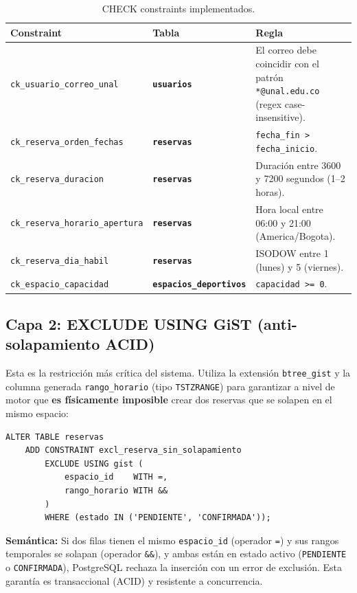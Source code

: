 \documentclass[12pt, a4paper]{article}
\newcommand{\tname}[1]{\texttt{\textbf{#1}}}
\begin{document}
\begin{table}[H]
\centering
\renewcommand{\arraystretch}{1.3}
\begin{tabularx}{\textwidth}{l l X}
    \toprule
    \textbf{Constraint} & \textbf{Tabla} & \textbf{Regla} \\
    \midrule
    \texttt{ck\_usuario\_correo\_unal} & \tname{usuarios} &
        El correo debe coincidir con el patrón \texttt{*@unal.edu.co} (regex case-insensitive). \\
    \texttt{ck\_reserva\_orden\_fechas} & \tname{reservas} &
        \texttt{fecha\_fin > fecha\_inicio}. \\
    \texttt{ck\_reserva\_duracion} & \tname{reservas} &
        Duración entre 3600 y 7200 segundos (1--2 horas). \\
    \texttt{ck\_reserva\_horario\_apertura} & \tname{reservas} &
        Hora local entre 06:00 y 21:00 (America/Bogota). \\
    \texttt{ck\_reserva\_dia\_habil} & \tname{reservas} &
        ISODOW entre 1 (lunes) y 5 (viernes). \\
    \texttt{ck\_espacio\_capacidad} & \tname{espacios\_deportivos} &
        \texttt{capacidad >= 0}. \\
    \bottomrule
\end{tabularx}
\caption{CHECK constraints implementados.}
\end{table}

\subsection{Capa 2: EXCLUDE USING GiST (anti-solapamiento ACID)}

Esta es la restricción más crítica del sistema. Utiliza la extensión \texttt{btree\_gist} y la columna generada \texttt{rango\_horario} (tipo \texttt{TSTZRANGE}) para garantizar a nivel de motor que \textbf{es físicamente imposible} crear dos reservas que se solapen en el mismo espacio:

\begin{lstlisting}[caption={Restricción de exclusión GiST para anti-solapamiento.}]
ALTER TABLE reservas
    ADD CONSTRAINT excl_reserva_sin_solapamiento
        EXCLUDE USING gist (
            espacio_id    WITH =,
            rango_horario WITH &&
        )
        WHERE (estado IN ('PENDIENTE', 'CONFIRMADA'));
\end{lstlisting}

\textbf{Semántica:} Si dos filas tienen el mismo \texttt{espacio\_id} (operador \texttt{=}) y sus rangos temporales se solapan (operador \texttt{\&\&}), y ambas están en estado activo (\texttt{PENDIENTE} o \texttt{CONFIRMADA}), PostgreSQL rechaza la inserción con un error de exclusión. Esta garantía es transaccional (ACID) y resistente a concurrencia.
\end{document}

